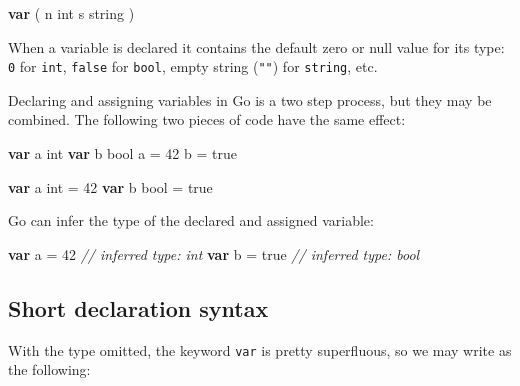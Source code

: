 \documentclass[]{book}
\newenvironment{Shaded}{\begin{snugshade}}{\end{snugshade}}
\newcommand{\CommentTok}[1]{\textcolor[rgb]{0.56,0.35,0.01}{\textit{#1}}}
\newcommand{\DataTypeTok}[1]{\textcolor[rgb]{0.13,0.29,0.53}{#1}}
\newcommand{\DecValTok}[1]{\textcolor[rgb]{0.00,0.00,0.81}{#1}}
\newcommand{\KeywordTok}[1]{\textcolor[rgb]{0.13,0.29,0.53}{\textbf{#1}}}
\newcommand{\NormalTok}[1]{#1}
\newcommand{\OtherTok}[1]{\textcolor[rgb]{0.56,0.35,0.01}{#1}}
\begin{document}
\begin{Shaded}
\begin{Highlighting}[]
\KeywordTok{var}\NormalTok{ (}
\NormalTok{    n }\DataTypeTok{int}
\NormalTok{    s }\DataTypeTok{string}
\NormalTok{)}
\end{Highlighting}
\end{Shaded}

When a variable is declared it contains the default zero or null value for its
type: \texttt{0} for \texttt{int}, \texttt{false} for \texttt{bool}, empty string (\texttt{""}) for \texttt{string}, etc.

Declaring and assigning variables in Go is a two step process, but they may be
combined. The following two pieces of code have the same effect:

\begin{Shaded}
\begin{Highlighting}[]
\KeywordTok{var}\NormalTok{ a }\DataTypeTok{int}
\KeywordTok{var}\NormalTok{ b }\DataTypeTok{bool}
\NormalTok{a = }\DecValTok{42}
\NormalTok{b = }\OtherTok{true}
\end{Highlighting}
\end{Shaded}

\begin{Shaded}
\begin{Highlighting}[]
\KeywordTok{var}\NormalTok{ a }\DataTypeTok{int}\NormalTok{ = }\DecValTok{42}
\KeywordTok{var}\NormalTok{ b }\DataTypeTok{bool}\NormalTok{ = }\OtherTok{true}
\end{Highlighting}
\end{Shaded}

Go can infer the type of the declared and assigned variable:

\begin{Shaded}
\begin{Highlighting}[]
\KeywordTok{var}\NormalTok{ a = }\DecValTok{42}   \CommentTok{// inferred type: int}
\KeywordTok{var}\NormalTok{ b = }\OtherTok{true} \CommentTok{// inferred type: bool}
\end{Highlighting}
\end{Shaded}

\hypertarget{short-declaration-syntax}{%
\subsection{Short declaration syntax}\label{short-declaration-syntax}}

With the type omitted, the keyword \texttt{var} is pretty superfluous, so we may write
as the following:
\end{document}
